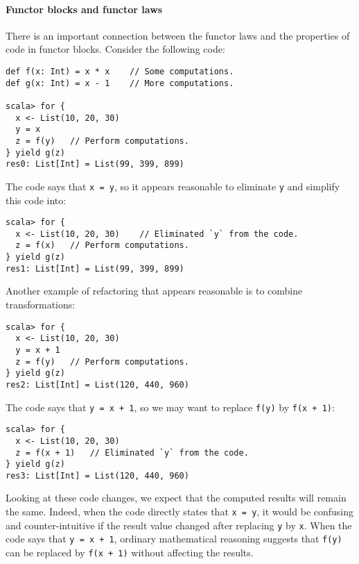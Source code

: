 \paragraph{Functor blocks and functor laws}

There is an important connection between the functor laws and the
properties of code in functor blocks. Consider the following code:
\begin{lstlisting}
def f(x: Int) = x * x    // Some computations.
def g(x: Int) = x - 1    // More computations.

scala> for {
  x <- List(10, 20, 30)
  y = x
  z = f(y)   // Perform computations.
} yield g(z)
res0: List[Int] = List(99, 399, 899)
\end{lstlisting}
The code says that \lstinline!x = y!, so it appears reasonable to
eliminate \lstinline!y! and simplify this code into:
\begin{lstlisting}
scala> for {
  x <- List(10, 20, 30)    // Eliminated `y` from the code.
  z = f(x)   // Perform computations.
} yield g(z)
res1: List[Int] = List(99, 399, 899)
\end{lstlisting}
Another example of refactoring that appears reasonable is to combine
transformations:
\begin{lstlisting}
scala> for {
  x <- List(10, 20, 30)
  y = x + 1
  z = f(y)   // Perform computations.
} yield g(z)
res2: List[Int] = List(120, 440, 960) 
\end{lstlisting}
The code says that \lstinline!y = x + 1!, so we may want to replace
\lstinline!f(y)! by \lstinline!f(x + 1)!:
\begin{lstlisting}
scala> for {
  x <- List(10, 20, 30)
  z = f(x + 1)   // Eliminated `y` from the code.
} yield g(z)
res3: List[Int] = List(120, 440, 960) 
\end{lstlisting}
Looking at these code changes, we expect that the computed results
will remain the same. Indeed, when the code directly states that \lstinline!x = y!,
it would be confusing and counter-intuitive if the result value changed
after replacing \lstinline!y! by \lstinline!x!. When the code says
that \lstinline!y = x + 1!, ordinary mathematical reasoning suggests
that \lstinline!f(y)! can be replaced by \lstinline!f(x + 1)! without
affecting the results.

